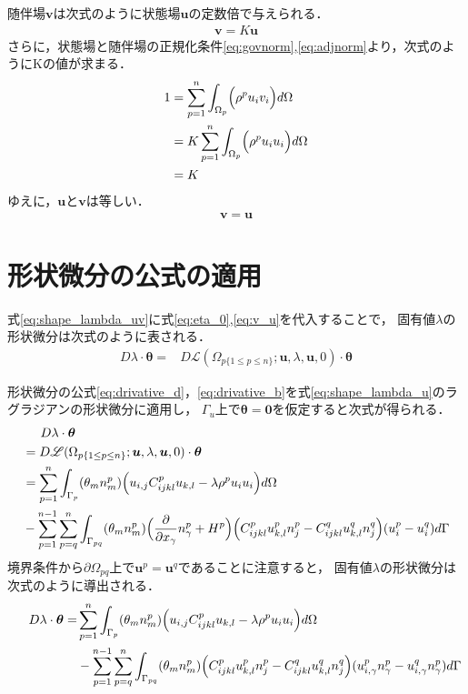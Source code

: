 随伴場$\bm{v}$は次式のように状態場$\bm{u}$の定数倍で与えられる．
\begin{align}
	\bm{v}=K\bm{u}
	\label{eq:v_ku}
\end{align}
さらに，状態場と随伴場の正規化条件\eqref{eq:govnorm},\eqref{eq:adjnorm}より，次式のようにKの値が求まる．
\begin{align}
	1&=\sum_{p=1}^{n}\int_{\Omega_p}\Bigr(\rho^{p}u_{i}v_{i}\Bigl) d\Omega
	\nonumber
	\\
	&=K\sum_{p=1}^{n}\int_{\Omega_p}\Bigr(\rho^{p}u_{i}u_{i}\Bigl) d\Omega
	\nonumber
	\\
	&=K
	\label{eq:k}
\end{align}
ゆえに，$\bm{u}$と$\bm{v}$は等しい．
\begin{align}
	\bm{v}=\bm{u}
	\label{eq:v_u}
\end{align}

\section{形状微分の公式の適用}

式\eqref{eq:shape_lambda_uv}に式\eqref{eq:eta_0},\eqref{eq:v_u}を代入することで，
固有値$\lambda$の形状微分は次式のように表される．
\begin{align}
	D\lambda\cdot\bm{\theta}
	=&D\mathscr{L}(\Omega_{p\{1\leq p\leq n\}};\bm{u},\lambda,\bm{u},0)\cdot\bm{\theta}
	\label{eq:shape_lambda_u}
\end{align}

形状微分の公式\eqref{eq:drivative_d}，\eqref{eq:drivative_b}を式\eqref{eq:shape_lambda_u}のラグラジアンの形状微分に適用し，
$\Gamma_{u}$上で$\bm{\theta}=\bm{0}$を仮定すると次式が得られる．
\begin{align}
	&\hspace{0.5cm}D\lambda\cdot\bm{\theta}
	\nonumber
	\\
	&=D\mathscr{L}(\Omega_{p\{1\leq p\leq n\}};\bm{u},\lambda,\bm{u},0)\cdot\bm{\theta}
	\nonumber
	\\
	&=\sum_{p=1}^{n}\int_{\Gamma_p}(\theta_{m}n_{m}^{p})\Bigr(u_{i,j}C_{ijkl}^{p}u_{k,l}-\lambda\rho^{p}u_{i}u_{i}\Bigl) d\Omega
	\nonumber
	\\
	&-\sum_{p=1}^{n-1}\sum_{p=q}^{n}\int_{\Gamma_{pq}}(\theta_{m}n_{m}^{p})
	\Bigr(\frac{\partial}{\partial x_\gamma }n_\gamma^{p} +H^{p}\Bigl)
	\Bigr(C_{ijkl}^{p}u_{k,l}^{p}n_{j}^{p}-C_{ijkl}^{q}u_{k,l}^{q}n_{j}^{q}\Bigl)
	(u_{i}^{p}-u_{i}^{q}) d\Gamma
	\label{eq:shape_lambda}
\end{align}
境界条件から$\partial \Omega_{pq}$上で$\bm{u}^{p}=\bm{u}^{q}$であることに注意すると，
固有値$\lambda$の形状微分は次式のように導出される．
\begin{align}
	\hspace{0.5cm}D\lambda\cdot\bm{\theta}
	=&\sum_{p=1}^{n}\int_{\Gamma_p}(\theta_{m}n_{m}^{p})\Bigr(u_{i,j}C_{ijkl}^{p}u_{k,l}-\lambda\rho^{p}u_{i}u_{i}\Bigl) d\Omega
	\nonumber
	\\
	&-\sum_{p=1}^{n-1}\sum_{p=q}^{n}\int_{\Gamma_{pq}}(\theta_{m}n_{m}^{p})
	\Bigr(C_{ijkl}^{p}u_{k,l}^{p}n_{j}^{p}-C_{ijkl}^{q}u_{k,l}^{q}n_{j}^{q}\Bigl)
	(u_{i,\gamma}^{p}n_\gamma^{p}-u_{i,\gamma}^{q}n_\gamma^{p}) d\Gamma
	\label{eq:shape_lambda}
\end{align}


